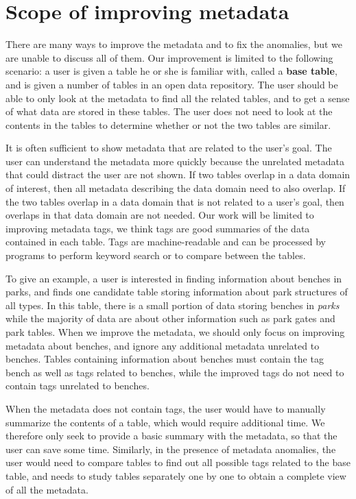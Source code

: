 \section{Scope of improving metadata}
\label{sec:ScopeOfImprovingMetadata}

There are many ways to improve the metadata and to fix the anomalies, but we are unable to discuss all of them. Our improvement is limited to the following scenario: a user is given a table he or she is familiar with, called a \textbf{\gls{base table}}, and is given a number of tables in an open data repository. The user should be able to only look at the metadata to find all the related tables, and to get a sense of what data are stored in these tables. The user does not need to look at the contents in the tables to determine whether or not the two tables are similar.

It is often sufficient to show metadata that are related to the user's goal. The user can understand the metadata more quickly because the unrelated metadata that could distract the user are not shown. If two tables overlap in a data domain of interest, then all metadata describing the data domain need to also overlap. If the two tables overlap in a data domain that is not related to a user's goal, then overlaps in that data domain are not needed. Our work will be limited to improving metadata tags, we think tags are good summaries of the data contained in each table. Tags are machine-readable and can be processed by programs to perform keyword search or to compare between the tables.

To give an example, a user is interested in finding information about benches in parks, and finds one candidate table storing information about park structures of all types. In this table, there is a small portion of data storing benches in \textit{parks} while the majority of data are about other information such as park gates and park tables. When we improve the metadata, we should only focus on improving metadata about benches, and ignore any additional metadata unrelated to benches. Tables containing information about benches must contain the tag bench as well as tags related to benches, while the improved tags do not need to contain tags unrelated to benches.

When the metadata does not contain tags, the user would have to manually summarize the contents of a table, which would require additional time. We therefore only seek to provide a basic summary with the metadata, so that the user can save some time. Similarly, in the presence of metadata anomalies, the user would need to compare tables to find out all possible tags related to the base table, and needs to study tables separately one by one to obtain a complete view of all the metadata.

